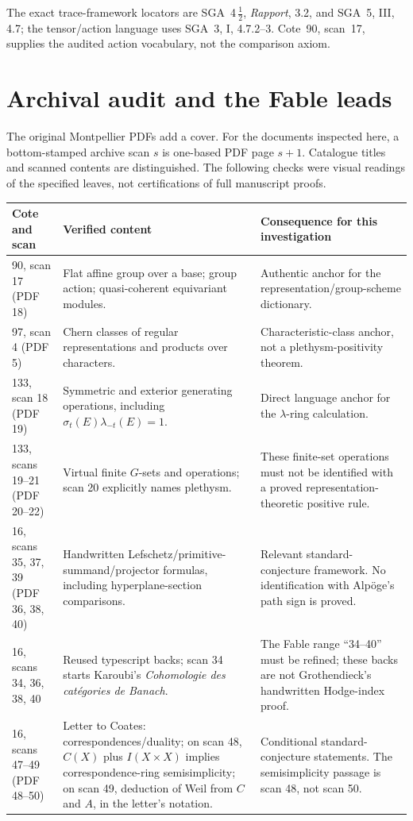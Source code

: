 The exact trace-framework locators are SGA~4\,$\frac12$, \emph{Rapport}, 3.2, and SGA~5, III, 4.7; the tensor/action language uses SGA~3, I, 4.7.2--3. Cote~90, scan~17, supplies the audited action vocabulary, not the comparison axiom.

\section{Archival audit and the Fable leads}\label{sec:archive}
The original Montpellier PDFs add a cover. For the documents inspected here, a bottom-stamped archive scan $s$ is one-based PDF page $s+1$. Catalogue titles and scanned contents are distinguished. The following checks were visual readings of the specified leaves, not certifications of full manuscript proofs.

{\small\begin{longtable}{p{.19\linewidth}p{.36\linewidth}p{.37\linewidth}}
\toprule Cote and scan&Verified content&Consequence for this investigation\\\midrule\endhead
90, scan 17 (PDF 18)&Flat affine group over a base; group action; quasi-coherent equivariant modules.&Authentic anchor for the representation/group-scheme dictionary.\\
97, scan 4 (PDF 5)&Chern classes of regular representations and products over characters.&Characteristic-class anchor, not a plethysm-positivity theorem.\\
133, scan 18 (PDF 19)&Symmetric and exterior generating operations, including $\sigma_t(E)\lambda_{-t}(E)=1$.&Direct language anchor for the $\lambda$-ring calculation.\\
133, scans 19--21 (PDF 20--22)&Virtual finite $G$-sets and operations; scan 20 explicitly names plethysm.&These finite-set operations must not be identified with a proved representation-theoretic positive rule.\\
16, scans 35, 37, 39 (PDF 36, 38, 40)&Handwritten Lefschetz/primitive-summand/projector formulas, including hyperplane-section comparisons.&Relevant standard-conjecture framework. No identification with Alp\"oge's path sign is proved.\\
16, scans 34, 36, 38, 40&Reused typescript backs; scan 34 starts Karoubi's \emph{Cohomologie des cat\'egories de Banach}.&The Fable range ``34--40'' must be refined; these backs are not Grothendieck's handwritten Hodge-index proof.\\
16, scans 47--49 (PDF 48--50)&Letter to Coates: correspondences/duality; on scan 48, $C(X)$ plus $I(X\times X)$ implies correspondence-ring semisimplicity; on scan 49, deduction of Weil from $C$ and $A$, in the letter's notation.&Conditional standard-conjecture statements. The semisimplicity passage is scan 48, not scan 50.\\

\end{longtable}}
